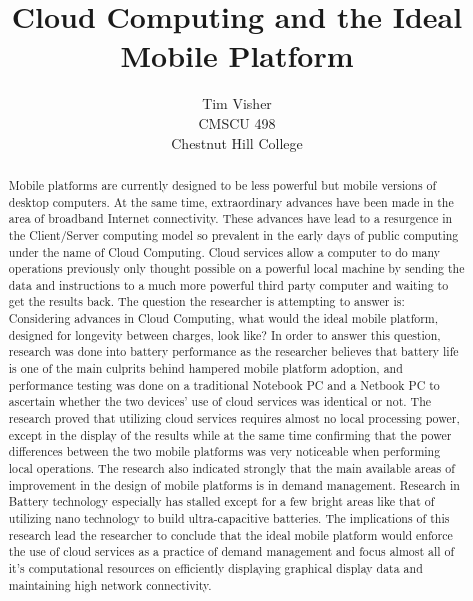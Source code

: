 \documentclass[12pt,oneside,letterpaper,titlepage]{report}
\author{Tim Visher\\ CMSCU 498\\ Chestnut Hill College}
\title{Cloud Computing and the Ideal Mobile Platform}
\begin{document}
\maketitle

\tableofcontents

\newpage

\begin{abstract}

Mobile platforms are currently designed to be less powerful but mobile versions
of desktop computers.  At the same time, extraordinary advances have been made
in the area of broadband Internet connectivity.  These advances have lead to a
resurgence in the Client/Server computing model so prevalent in the early days
of public computing under the name of Cloud Computing.  Cloud services allow a
computer to do many operations previously only thought possible on a powerful
local machine by sending the data and instructions to a much more powerful third
party computer and waiting to get the results back.  The question the researcher
is attempting to answer is: Considering advances in Cloud Computing, what would
the ideal mobile platform, designed for longevity between charges, look like?
In order to answer this question, research was done into battery performance as
the researcher believes that battery life is one of the main culprits behind
hampered mobile platform adoption, and performance testing was done on a
traditional Notebook PC and a Netbook PC to ascertain whether the two devices'
use of cloud services was identical or not.  The research proved that utilizing
cloud services requires almost no local processing power, except in the display
of the results while at the same time confirming that the power differences
between the two mobile platforms was very noticeable when performing local
operations.  The research also indicated strongly that the main available areas
of improvement in the design of mobile platforms is in demand management.
Research in Battery technology especially has stalled except for a few bright
areas like that of utilizing nano technology to build ultra-capacitive
batteries.  The implications of this research lead the researcher to conclude
that the ideal mobile platform would enforce the use of cloud services as a
practice of demand management and focus almost all of it's computational
resources on efficiently displaying graphical display data and maintaining high
network connectivity.

\end{abstract}
\end{document}
